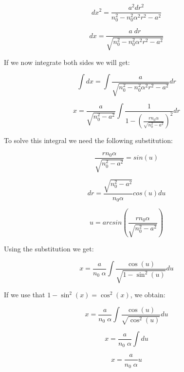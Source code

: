 \documentclass{article}
\begin{document}
\begin{equation}
	dx^2 =\frac{a^2 dr^2}{n_0 ^2 - n_0^2 \alpha ^2 r^2 - a^2}
\end{equation}

\begin{equation}
	dx =\frac{a \; dr}{\sqrt{n_0 ^2 - n_0^2 \alpha ^2 r^2 - a^2}}
\end{equation}

If we now integrate both sides we will get:

\begin{equation}
	\int dx = \int \frac{a}{\sqrt{n_0 ^2 - n_0^2 \alpha ^2 r^2 - a^2}} dr
\end{equation}

\begin{equation}
	x = \frac{a}{\sqrt{n_0^2 - a^2}} \int \frac{1}{1 - \left( \frac{r n_0 \alpha}{\sqrt{n_0^2-a^2}} \right) ^2} dr
\end{equation}

To solve this integral we need the following substitution:

\begin{equation}
	 \frac{r n_0 \alpha}{\sqrt{n_0^2-a^2}} = sin(u)
\end{equation}

\begin{equation}
	 dr = \frac{\sqrt{n_0^2-a^2}}{n_0 \alpha} cos(u) du
\end{equation} 

\begin{equation}
	 u = arcsin \left( \frac{r n_0 \alpha}{\sqrt{n_0^2-a^2}} \right)
\end{equation}

Using the substitution we get:

\begin{equation}
	x = \frac{a}{n_0 \; \alpha} \int \frac{\cos (u)}{\sqrt{1 - \sin^2 (u)}} du
\end{equation}

If we use that $1 - \sin^2 (x) = \cos^2 (x)$, we obtain:

\begin{equation}
	x = \frac{a}{n_0 \; \alpha} \int \frac{\cos (u)}{\sqrt{\cos^2 (u)}} du
\end{equation}

\begin{equation}
	x = \frac{a}{n_0 \; \alpha} \int du
\end{equation}

\begin{equation}
	x = \frac{a}{n_0 \; \alpha} u
\end{equation}
\end{document}
